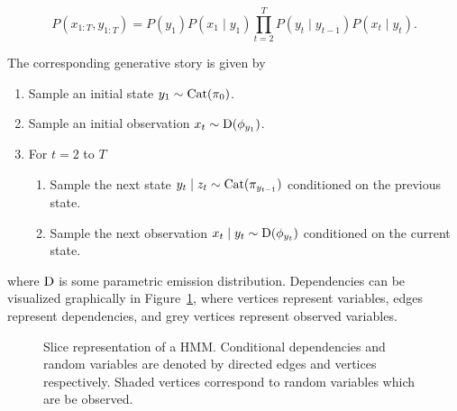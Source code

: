 \documentclass[12pt]{report}
\newcommand{\1}[0]{\mathbbm{1}}
\newcommand{\Cat}[0]{\textnormal{Cat}}
\newcommand{\SomeDist}[0]{\textnormal{D}}
\newcommand{\seq}[3]{\ensuremath{#1_{{#2}:{#3}}}}
\begin{document}
\begin{equation}\label{eq:hmm-joint}
    P(\seq{x}{1}{T}, \seq{y}{1}{T}) =
    P(y_1)P(x_1 \mid y_1) \prod_{t=2}^T P(y_t \mid y_{t-1}) P(x_t \mid y_t).
\end{equation}

The corresponding generative story is given by

\begin{enumerate}
    \item Sample an initial state $y_1 \sim \Cat(\pi_0)$.
    \item Sample an initial observation $x_t \sim \SomeDist(\phi_{y_1})$.
    \item For $t = 2$ to $T$
    \begin{enumerate}
        \item Sample the next state $y_{t} \mid z_t \sim \Cat(\pi_{y_{t-1}})$ conditioned on the previous state.
        \item Sample the next observation $x_t \mid y_t \sim \SomeDist(\phi_{y_t})$ conditioned on the current state.
    \end{enumerate}
\end{enumerate}

where $\SomeDist$ is some parametric emission distribution.
Dependencies can be visualized graphically in Figure~\ref{fig:hmm},
where vertices represent variables, edges represent dependencies,
and grey vertices represent observed variables.

\begin{figure}[ht!]
    \centering
    \caption[Slice representation of a HMM]{
        Slice representation of a HMM.
        Conditional dependencies and random variables are denoted by
        directed edges and vertices respectively. Shaded vertices correspond
        to random variables which are be observed.
    }
    \label{fig:hmm}
\end{figure}
\end{document}
